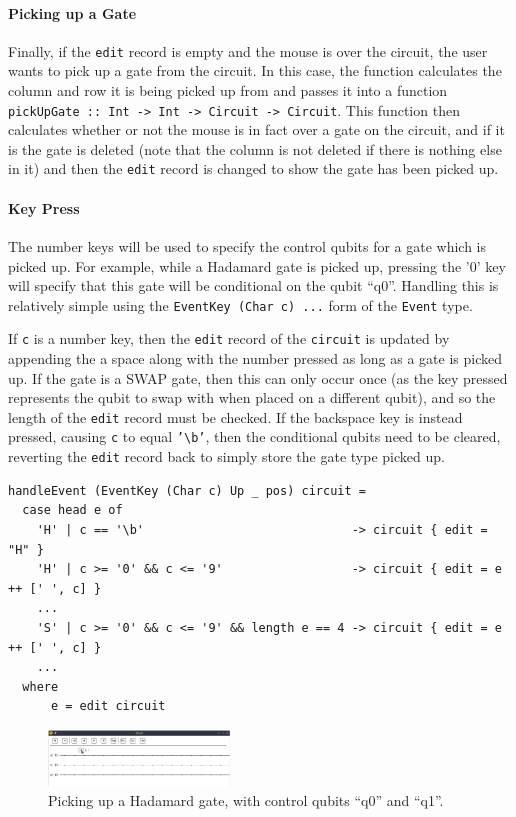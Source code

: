 \documentclass[a4paper,10pt, titlepage, twoside]{article}
\begin{document}
\paragraph{Picking up a Gate}
Finally, if the \texttt{edit} record is empty and the mouse is over the circuit, the user wants to pick up a gate from the circuit. In this case, the function calculates the column and row it is being picked up from and passes it into a function \texttt{pickUpGate :: Int -> Int -> Circuit -> Circuit}. This function then calculates whether or not the mouse is in fact over a gate on the circuit, and if it is the gate is deleted (note that the column is not deleted if there is nothing else in it) and then the \texttt{edit} record is changed to show the gate has been picked up.\par

\paragraph{Key Press}
The number keys will be used to specify the control qubits for a gate which is picked up. For example, while a Hadamard gate is picked up, pressing the '0' key will specify that this gate will be conditional on the qubit ``q0''. Handling this is relatively simple using the \texttt{EventKey (Char c) ...} form of the \texttt{Event} type.\par
If \texttt{c} is a number key, then the \texttt{edit} record of the \texttt{circuit} is updated by appending the a space along with the number pressed as long as a gate is picked up. If the gate is a SWAP gate, then this can only occur once (as the key pressed represents the qubit to swap with when placed on a different qubit), and so the length of the \texttt{edit} record must be checked. If the backspace key is instead pressed, causing \texttt{c} to equal \texttt{'\textbackslash b'}, then the conditional qubits need to be cleared, reverting the \texttt{edit} record back to simply store the gate type picked up.\par
\begin{verbatim}
handleEvent (EventKey (Char c) Up _ pos) circuit =
  case head e of
    'H' | c == '\b'                             -> circuit { edit = "H" }
    'H' | c >= '0' && c <= '9'                  -> circuit { edit = e ++ [' ', c] }
    ...
    'S' | c >= '0' && c <= '9' && length e == 4 -> circuit { edit = e ++ [' ', c] }
    ...
  where
      e = edit circuit
\end{verbatim}
\begin{figure}
    \centering
    \includegraphics[width=0.43\textwidth]{editH}
    \caption{Picking up a Hadamard gate, with control qubits ``q0'' and ``q1''.}
\end{figure}
\end{document}
